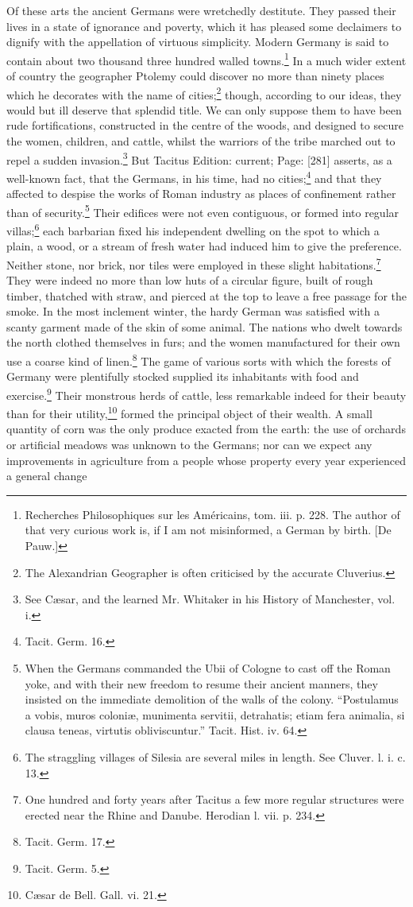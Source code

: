 Of these arts the ancient Germans were wretchedly destitute. They passed their lives in a state of ignorance and poverty, which it has pleased some declaimers to dignify with the appellation of virtuous simplicity. Modern Germany is said to contain about two thousand three hundred walled towns.\footnote{Recherches Philosophiques sur les Américains, tom. iii. p. 228. The author of that very curious work is, if I am not misinformed, a German by birth. [De Pauw.]} In a much wider extent of country the geographer Ptolemy could discover no more than ninety places which he decorates with the name of cities;\footnote{The Alexandrian Geographer is often criticised by the accurate Cluverius.} though, according to our ideas, they would but ill deserve that splendid title. We can only suppose them to have been rude fortifications, constructed in the centre of the woods, and designed to secure the women, children, and cattle, whilst the warriors of the tribe marched out to repel a sudden invasion.\footnote{See Cæsar, and the learned Mr. Whitaker in his History of Manchester, vol. i.} But Tacitus Edition: current; Page: [281] asserts, as a well-known fact, that the Germans, in his time, had no cities;\footnote{Tacit. Germ. 16.} and that they affected to despise the works of Roman industry as places of confinement rather than of security.\footnote{When the Germans commanded the Ubii of Cologne to cast off the Roman yoke, and with their new freedom to resume their ancient manners, they insisted on the immediate demolition of the walls of the colony. \texthebrew{“}Postulamus a vobis, muros coloniæ, munimenta servitii, detrahatis; etiam fera animalia, si clausa teneas, virtutis obliviscuntur.\texthebrew{}” Tacit. Hist. iv. 64.} Their edifices were not even contiguous, or formed into regular villas;\footnote{The straggling villages of Silesia are several miles in length. See Cluver. l. i. c. 13.} each barbarian fixed his independent dwelling on the spot to which a plain, a wood, or a stream of fresh water had induced him to give the preference. Neither stone, nor brick, nor tiles were employed in these slight habitations.\footnote{One hundred and forty years after Tacitus a few more regular structures were erected near the Rhine and Danube. Herodian l. vii. p. 234.} They were indeed no more than low huts of a circular figure, built of rough timber, thatched with straw, and pierced at the top to leave a free passage for the smoke. In the most inclement winter, the hardy German was satisfied with a scanty garment made of the skin of some animal. The nations who dwelt towards the north clothed themselves in furs; and the women manufactured for their own use a coarse kind of linen.\footnote{Tacit. Germ. 17.} The game of various sorts with which the forests of Germany were plentifully stocked supplied its inhabitants with food and exercise.\footnote{Tacit. Germ. 5.} Their monstrous herds of cattle, less remarkable indeed for their beauty than for their utility,\footnote{Cæsar de Bell. Gall. vi. 21.} formed the principal object of their wealth. A small quantity of corn was the only produce exacted from the earth: the use of orchards or artificial meadows was unknown to the Germans; nor can we expect any improvements in agriculture from a people whose property every year experienced a general change 